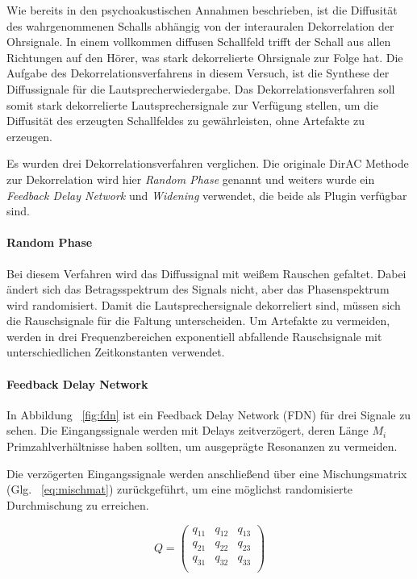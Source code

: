 Wie bereits in den psychoakustischen Annahmen beschrieben, ist die Diffusität des wahrgenommenen Schalls abhängig von der interauralen Dekorrelation der Ohrsignale. In einem vollkommen diffusen Schallfeld trifft der Schall aus allen Richtungen auf den Hörer, was stark dekorrelierte Ohrsignale zur Folge hat. Die Aufgabe des Dekorrelationsverfahrens in diesem Versuch, ist die Synthese der Diffussignale für die Lautsprecherwiedergabe. Das Dekorrelationsverfahren soll somit stark dekorrelierte Lautsprechersignale zur Verfügung stellen, um die Diffusität des erzeugten Schallfeldes zu gewährleisten, ohne Artefakte zu erzeugen.

Es wurden drei Dekorrelationsverfahren verglichen. Die originale DirAC Methode zur Dekorrelation wird hier \textit{Random Phase} genannt und weiters wurde ein \textit{Feedback Delay Network} und \textit{Widening} verwendet, die beide als Plugin verfügbar sind.

\paragraph{Random Phase}
\label{randphas}
Bei diesem Verfahren wird das Diffussignal mit weißem Rauschen gefaltet. Dabei ändert sich das Betragsspektrum des Signals nicht, aber das Phasenspektrum wird randomisiert. Damit die Lautsprechersignale dekorreliert sind, müssen sich die Rauschsignale für die Faltung unterscheiden. Um Artefakte zu vermeiden, werden in drei Frequenzbereichen exponentiell abfallende Rauschsignale mit unterschiedlichen Zeitkonstanten verwendet.

\paragraph{Feedback Delay Network}

In Abbildung ~\ref{fig:fdn} ist ein Feedback Delay Network (FDN) für drei Signale zu sehen. Die Eingangssignale werden mit Delays zeitverzögert, deren Länge $M_i$ Primzahlverhältnisse haben sollten, um ausgeprägte Resonanzen zu vermeiden.

Die verzögerten Eingangssignale werden anschließend über eine Mischungsmatrix (Glg. ~\ref{eq:mischmat}) zurückgeführt, um eine möglichst randomisierte Durchmischung zu erreichen.

\begin{equation}
    Q = 
    \begin{pmatrix}
		q_{11} & q_{12} & q_{13} \\
        q_{21} & q_{22} & q_{23} \\
        q_{31} & q_{32} & q_{33} \\
    \end{pmatrix}
    \label{eq:mischmat}
\end{equation}

